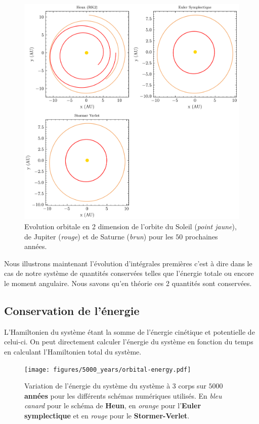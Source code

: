 \documentclass[11pt,twoside=semi,openright,numbers=noenddot]{article}
\begin{document}
\begin{figure}[H]
  \centering
  \includegraphics{figures/50_years/orbital-plot2d.png}
  \caption{Evolution orbitale en 2 dimension de l'orbite du Soleil (\emph{point jaune}), de Jupiter (\emph{rouge}) et de Saturne (\emph{brun}) pour les $50$ prochaines années.}
  \label{fig:plot2D--50}
\end{figure}

Nous illustrons maintenant l'évolution d'intégrales premières c'est à dire dans le cas de notre système de quantités conservées telles que l'énergie totale ou encore le moment angulaire. Nous savons qu'en théorie ces 2 quantités sont conservées.

\subsection{Conservation de l'énergie}

L'Hamiltonien du système étant la somme de l'énergie cinétique et potentielle de celui-ci. On peut directement calculer l'énergie du système en fonction du temps en calculant l'Hamiltonien total du système.

\begin{figure}[H]
    \centering
    \texttt{[image: figures/5000\_years/orbital-energy.pdf]}
    \caption{Variation de l'énergie du système du système à 3 corps sur \textbf{$5000$ années} pour les différents schémas numériques utilisés. En \emph{bleu canard} pour le schéma de \textbf{Heun}, en \emph{orange} pour l'\textbf{Euler symplectique} et en \emph{rouge} pour le \textbf{Stormer-Verlet}.}
    \label{fig:orbital-energy--5000}
\end{figure}
\end{document}
